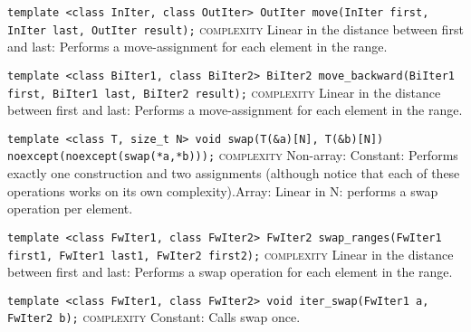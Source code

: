 \noindent{}\hspace*{0.25em}\lstinline[basicstyle=\ttfamily\color{corange}]{template <class InIter, class OutIter> OutIter move(InIter first, InIter last, OutIter result);} \textsc{complexity} Linear in the distance between first and last: Performs a move-assignment for each element in the range.\\\vspace{-0.6em}

\noindent{}\hspace*{0.25em}\lstinline[basicstyle=\ttfamily\color{corange}]{template <class BiIter1, class BiIter2> BiIter2 move_backward(BiIter1 first, BiIter1 last, BiIter2 result);} \textsc{complexity} Linear in the distance between first and last: Performs a move-assignment for each element in the range.\\\vspace{-0.6em}

\noindent{}\hspace*{0.25em}\lstinline[basicstyle=\ttfamily\color{corange}]{template <class T, size_t N> void swap(T(&a)[N], T(&b)[N]) noexcept(noexcept(swap(*a,*b)));} \textsc{complexity} Non-array: Constant: Performs exactly one construction and two assignments (although notice that each of these operations works on its own complexity).Array: Linear in N: performs a swap operation per element.\\\vspace{-0.6em}

\noindent{}\hspace*{0.25em}\lstinline[basicstyle=\ttfamily\color{corange}]{template <class FwIter1, class FwIter2> FwIter2 swap_ranges(FwIter1 first1, FwIter1 last1, FwIter2 first2);} \textsc{complexity} Linear in the distance between first and last: Performs a swap operation for each element in the range.\\\vspace{-0.6em}

\noindent{}\hspace*{0.25em}\lstinline[basicstyle=\ttfamily\color{cgreen}]{template <class FwIter1, class FwIter2> void iter_swap(FwIter1 a, FwIter2 b);} \textsc{complexity} Constant: Calls swap once.\\\vspace{-0.6em}

